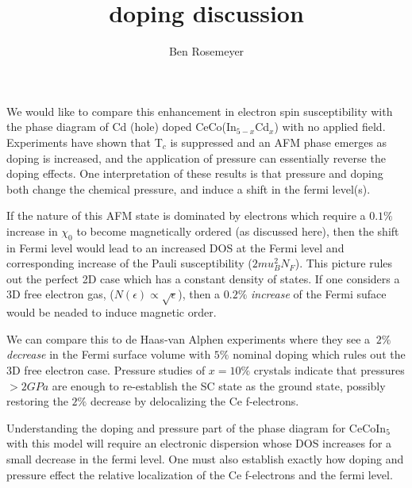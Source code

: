 \documentclass[a4paper,11pt]{article}
\title{doping discussion}
\author{Ben Rosemeyer}
\begin{document}
\maketitle


\section*{}
We would like to compare this enhancement in electron spin susceptibility with the phase diagram of Cd (hole) doped CeCo(In$_{5-x}$Cd$_x$) with no applied field. Experiments have shown that T$_c$ is suppressed and an AFM phase emerges as doping is increased, and the application of pressure can essentially reverse the doping effects. One interpretation of these results is that pressure and doping both change the chemical pressure, and induce a shift in the fermi level(s). 

If the nature of this AFM state is dominated by electrons which require a $0.1\%$ increase in $\chi_0$ to become magnetically ordered (as discussed here), then the shift in Fermi level would lead to an increased DOS at the Fermi level and corresponding increase of the Pauli susceptibility ($2mu_B^2 N_F$). This picture rules out the perfect 2D case which has a constant density of states. If one considers a 3D free electron gas, ($N(\epsilon) \propto\sqrt{\epsilon}$), then a $0.2\%$ \textit{increase} of the Fermi suface would be neaded to induce magnetic order. 

We can compare this to de Haas-van Alphen experiments where they see a $~2\%$ \textit{decrease} in the Fermi surface volume with $5\%$ nominal doping which rules out the 3D free electron case. Pressure studies of $x=10\%$ crystals indicate that pressures $>2GPa$ are enough to re-establish the SC state as the ground state, possibly restoring the $2\%$ decrease by delocalizing the Ce f-electrons.

Understanding the doping and pressure part of the phase diagram for CeCoIn$_5$ with this model will require an electronic dispersion whose DOS increases for a small decrease in the fermi level. One must also establish exactly how doping and pressure effect the relative localization of the Ce f-electrons and the fermi level.
\end{document}
